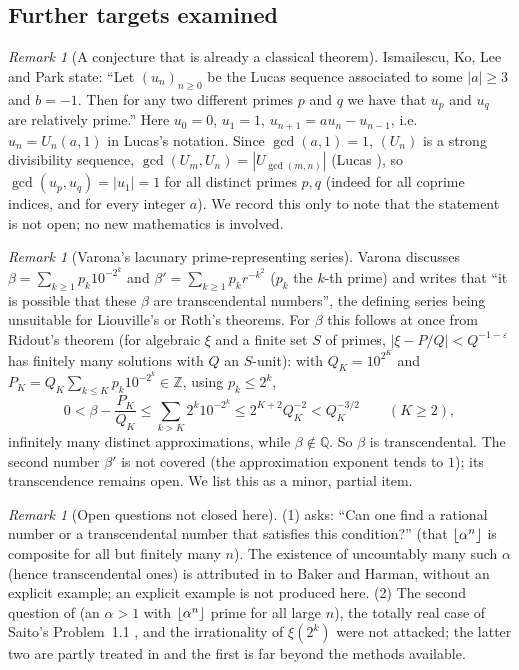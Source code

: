 \documentclass[11pt]{amsart}
\theoremstyle{definition}
\theoremstyle{remark}
\newtheorem{remark}[theorem]{Remark}
\providecommand{\Q}{\mathbb Q}
\providecommand{\Z}{\mathbb Z}
\begin{document}
\subsection{Further targets examined}
\label{R6:subsec:other}

\begin{remark}[A conjecture that is already a classical theorem]\label{R6:rem:IKLP}
Ismailescu, Ko, Lee and Park \cite[Conjecture~6.2]{R6-IKLP} state: ``Let $(u_n)_{n\ge0}$ be the Lucas
sequence associated to some $|a|\ge3$ and $b=-1$. Then for any two different primes $p$ and $q$ we
have that $u_p$ and $u_q$ are relatively prime.'' Here $u_0=0$, $u_1=1$, $u_{n+1}=au_n-u_{n-1}$, i.e.\
$u_n=U_n(a,1)$ in Lucas's notation. Since $\gcd(a,1)=1$, $(U_n)$ is a strong divisibility sequence,
$\gcd(U_m,U_n)=|U_{\gcd(m,n)}|$ (Lucas \cite{R6-Lucas}), so $\gcd(u_p,u_q)=|u_1|=1$ for all distinct
primes $p,q$ (indeed for all coprime indices, and for every integer $a$). We record this only to note
that the statement is not open; no new mathematics is involved.
\end{remark}

\begin{remark}[Varona's lacunary prime-representing series]\label{R6:rem:varona}
Varona \cite[\S1]{R6-Varona} discusses $\beta=\sum_{k\ge1}p_k10^{-2^k}$ and
$\beta'=\sum_{k\ge1}p_kr^{-k^2}$ ($p_k$ the $k$-th prime) and writes that ``it is possible that these
$\beta$ are transcendental numbers'', the defining series being unsuitable for Liouville's or Roth's
theorems. For $\beta$ this follows at once from Ridout's theorem \cite{R6-Ridout} (for algebraic
$\xi$ and a finite set $S$ of primes, $|\xi-P/Q|<Q^{-1-\varepsilon}$ has finitely many solutions with $Q$
an $S$-unit): with $Q_K=10^{2^K}$ and $P_K=Q_K\sum_{k\le K}p_k10^{-2^k}\in\Z$, using $p_k\le2^k$,
\[
0<\beta-\frac{P_K}{Q_K}\le\sum_{k>K}2^k10^{-2^k}\le 2^{K+2}Q_K^{-2}<Q_K^{-3/2}\qquad(K\ge2),
\]
infinitely many distinct approximations, while $\beta\notin\Q$. So $\beta$ is transcendental. The
second number $\beta'$ is not covered (the approximation exponent tends to $1$); its transcendence remains
open. We list this as a minor, partial item.
\end{remark}

\begin{remark}[Open questions not closed here]\label{R6:rem:notclosed}
(1) \cite[\S7]{R6-HIKK} asks: ``Can one find a rational number or a transcendental number that
satisfies this condition?'' (that $\left\lfloor \alpha^n\right\rfloor$ is composite for all but finitely many $n$). The
existence of uncountably many such $\alpha$ (hence transcendental ones) is attributed in
\cite{R6-HIKK} to Baker and Harman, without an explicit example; an explicit example is not produced
here. (2) The second question of \cite[\S7]{R6-HIKK} (an $\alpha>1$ with $\left\lfloor \alpha^n\right\rfloor$ prime for all
large $n$), the totally real case of Saito's Problem~1.1 \cite{R6-Saito}, and the irrationality of
$\xi(2^k)$ were not attacked; the latter two are partly treated in \cite{K-031,K-042} and the first is
far beyond the methods available.
\end{remark}
\end{document}
